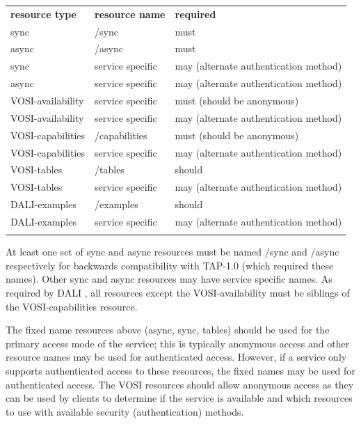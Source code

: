 \documentclass[11pt,letter]{ivoa}
\begin{document}
\medskip
\begin{inlinetable}
\begin{tabular}{l l l}
\sptablerule
\textbf{resource type} & \textbf{resource name} & \textbf{required} \\
\sptablerule
{sync} & /sync & must \\
{async} & /async & must \\
{sync} & service specific & may (alternate authentication method) \\
{async} & service specific & may (alternate authentication method) \\
VOSI-availability & service specific & must (should be anonymous) \\
VOSI-availability & service specific & may (alternate authentication method) \\
VOSI-capabilities & /capabilities & must (should be anonymous) \\
VOSI-capabilities & service specific & may (alternate authentication method) \\
VOSI-tables & /tables & should \\
VOSI-tables & service specific & may (alternate authentication method) \\
DALI-examples & /examples & should \\
DALI-examples & service specific & may (alternate authentication method) \\
\sptablerule
\end{tabular}
\end{inlinetable}
\medskip

At least one set of {sync} and {async} resources must be named /sync and 
/async respectively for backwards compatibility with TAP-1.0 (which required 
these names). Other  {sync} and {async} resources may have service specific names. 
As required by DALI \citep{std:DALI11}, all resources except the VOSI-availability must 
be siblings of the VOSI-capabilities resource. 

The fixed name resources above (async, sync, tables) should be used for the 
primary access mode of the service; this is typically anonymous access and 
other resource names may be used for authenticated access. However, if a 
service only supports authenticated access to these resources, the fixed names 
may be used for authenticated access. The VOSI resources should allow anonymous 
access as they can be used by clients to determine if the service is available 
and which resources to use with available security (authentication) methods. 
\end{document}
